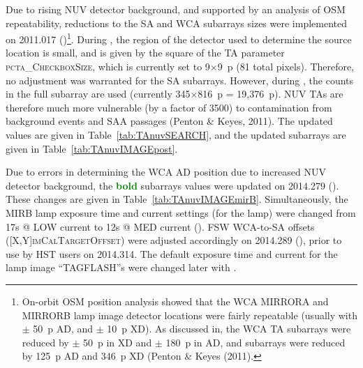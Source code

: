 Due to rising NUV detector background, and supported by an analysis of OSM repeatability, reductions to the SA   and
WCA  subarrays sizes were implemented on 2011.017 ()\footnote{On-orbit OSM position analysis showed that the WCA  MIRRORA and MIRRORB lamp image
detector locations were fairly repeatable (usually with $\pm$ 50~p AD, and $\pm$ 10~p XD). As discussed in, the WCA TA  subarrays were reduced by $\pm$ 50~p in XD and $\pm$ 180~p in AD,
and  subarrays were reduced by 125~p AD and 346~p XD (Penton \& Keyes (2011).}.
During , the region of the detector used to determine the source location is small, and is given by the square of the TA parameter \textsc{pcta\_CheckboxSize}, which is currently set to 9$\times$9~p (81 total pixels).
Therefore, no adjustment was warranted for the SA  subarrays. However, during , the counts in the full subarray are used (currently 345$\times$816~p = 19,376~p).
NUV  TAs are therefore much more vulnerable (by a factor of 3500) to contamination from background events and SAA passages (Penton \& Keyes, 2011).
The updated  values are given in Table~\ref{tab:TAnuvSEARCH}, and the updated  subarrays are given in Table~\ref{tab:TAnuvIMAGEpost}.

Due to errors in determining the WCA AD position due to increased NUV detector background, the {\bf \textcolor{GREEN}{bold}} subarrays values were updated on 2014.279 ().
These changes are given in Table~\ref{tab:TAnuvIMAGEmirB}. Simultaneously, the MIRB \tacq{} lamp exposure time and current settings (for the \plamptwo{} lamp)
were changed from 17s @ LOW current to 12s @ MED current (). FSW WCA-to-SA offsets (\textsc{[X,Y]imCalTargetOffset}) were adjusted accordingly on 2014.289 (),
prior to use by HST users on 2014.314. The default exposure time and current for the \plampone{} lamp image ``TAGFLASH''s were changed later with .

